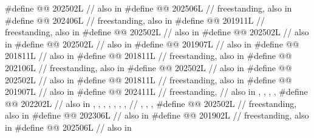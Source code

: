 \begin{codeblock}
#define @@                     202502L // also in 
#define @@                  202506L // freestanding, also in 
#define @@                     202406L // freestanding, also in 
#define @@                 201911L // freestanding, also in 
#define @@                   202502L // also in 
#define @@                     202502L // also in 
#define @@                   202502L // also in 
#define @@                  201907L // also in 
#define @@             201811L // also in 
#define @@                   201811L // freestanding, also in 
#define @@                202106L // freestanding, also in 
#define @@           202502L // also in 
#define @@           202502L // also in 
#define @@                 201811L // freestanding, also in 
#define @@                  201907L // also in 
#define @@              202411L // freestanding,
  // also in , , , , 
#define @@                 202202L
  // also in , , , , , , ,
  // , , , 
#define @@                         202502L // freestanding, also in 
#define @@                 202306L // also in 
#define @@                         201902L // freestanding, also in 
#define @@                    202506L // also in 

\end{codeblock}
